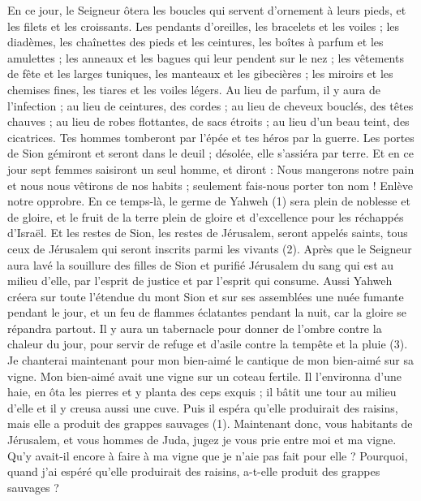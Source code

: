 \begin{multicols}{2}
En ce jour, le Seigneur ôtera les boucles qui servent d’ornement à leurs pieds, et les filets et les croissants.
Les pendants d’oreilles, les bracelets et les voiles ;
les diadèmes, les chaînettes des pieds et les ceintures, les boîtes à parfum et les amulettes ;
les anneaux et les bagues qui leur pendent sur le nez ;
les vêtements de fête et les larges tuniques, les manteaux et les gibecières ;
les miroirs et les chemises fines, les tiares et les voiles légers.
Au lieu de parfum, il y aura de l’infection ; au lieu de ceintures, des cordes ; au lieu de cheveux bouclés, des têtes chauves ; au lieu de robes flottantes, de sacs étroits ; au lieu d'un beau teint, des cicatrices.
Tes hommes tomberont par l'épée et tes héros par la guerre.
Les portes de Sion gémiront et seront dans le deuil ; désolée, elle s’assiéra par terre.
\VerseOne{}Et en ce jour sept femmes saisiront un seul homme, et diront : Nous mangerons notre pain et nous nous vêtirons de nos habits ; seulement fais-nous porter ton nom ! Enlève notre opprobre.
En ce temps-là, le germe de Yahweh (1) sera plein de noblesse et de gloire, et le fruit de la terre plein de gloire et d'excellence pour les réchappés d'Israël.
Et les restes de Sion, les restes de Jérusalem, seront appelés saints, tous ceux de Jérusalem qui seront inscrits parmi les vivants (2).
Après que le Seigneur aura lavé la souillure des filles de Sion et purifié Jérusalem du sang qui est au milieu d'elle, par l’esprit de justice et par l’esprit qui consume.
Aussi Yahweh créera sur toute l'étendue du mont Sion et sur ses assemblées une nuée fumante pendant le jour, et un feu de flammes éclatantes pendant la nuit, car la gloire se répandra partout.
Il y aura un tabernacle pour donner de l'ombre contre la chaleur du jour, pour servir de refuge et d'asile contre la tempête et la pluie (3).
\VerseOne{}Je chanterai maintenant pour mon bien-aimé le cantique de mon bien-aimé sur sa vigne. Mon bien-aimé avait une vigne sur un coteau fertile.
Il l'environna d'une haie, en ôta les pierres et y planta des ceps exquis ; il bâtit une tour au milieu d'elle et il y creusa aussi une cuve. Puis il espéra qu'elle produirait des raisins, mais elle a produit des grappes sauvages (1).
Maintenant donc, vous habitants de Jérusalem, et vous hommes de Juda, jugez je vous prie entre moi et ma vigne.
Qu'y avait-il encore à faire à ma vigne que je n’aie pas fait pour elle ? Pourquoi, quand j’ai espéré qu'elle produirait des raisins, a-t-elle produit des grappes sauvages ?

\end{multicols}
